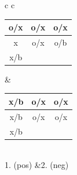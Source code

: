 \documentclass[11pt]{article}
\begin{document}
\begin{figure}[!ht]

\begin{subfigure}{\textwidth}
\centering
\begin{tabular}{c c}
	\begin{small}
	\begin{tabular}{c|c|c}
	\hspace*{-0.4em}o/x\hspace*{-0.4em}&\hspace*{-0.4em}o/x\hspace*{-0.4em}&\hspace*{-0.4em}o/x\hspace*{-0.4em}\\ \hline
	\hspace*{-0.4em}x\hspace*{-0.4em}&\hspace*{-0.4em}o/x\hspace*{-0.4em}&\hspace*{-0.4em}o/b\hspace*{-0.4em}\\ \hline
	\hspace*{-0.4em}x/b\hspace*{-0.4em}&&
	\end{tabular}
	\end{small}
	&
	\begin{small}
	\begin{tabular}{c|c|c}
	\hspace*{-0.4em}x/b\hspace*{-0.4em}&\hspace*{-0.4em}o/x\hspace*{-0.4em}&\hspace*{-0.4em}o/x\hspace*{-0.4em}\\ \hline
	\hspace*{-0.4em}x/b\hspace*{-0.4em}&\hspace*{-0.4em}o/x\hspace*{-0.4em}&\hspace*{-0.4em}o/x\hspace*{-0.4em}\\ \hline
	\hspace*{-0.4em}x/b\hspace*{-0.4em}&&
	\end{tabular}
	\end{small}\\
	1. (pos) &2. (neg)


\end{tabular}
\end{subfigure}
\end{figure}
\end{document}
